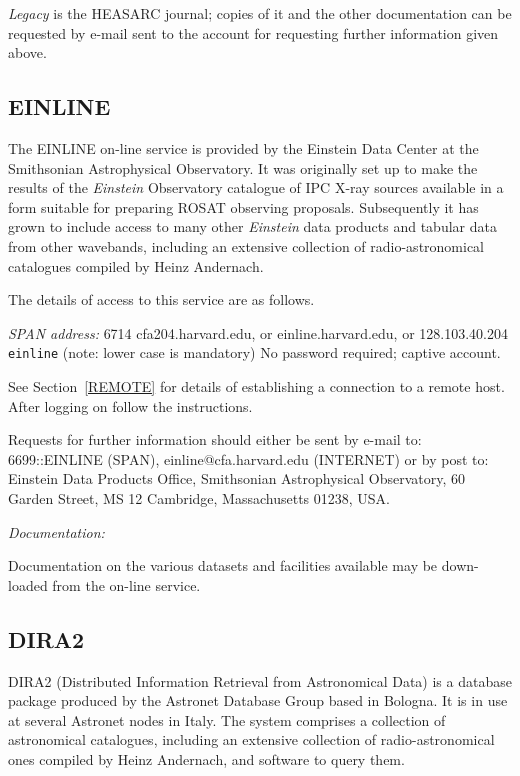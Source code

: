 \documentclass[twoside,11pt]{article}
\newcommand{\xlabel}[1]{}
\begin{document}
{\it Legacy} is the HEASARC journal; copies of it and the other 
documentation can be requested by e-mail sent to the account for 
requesting further information given above.

\subsection{EINLINE\xlabel{einline}}

The EINLINE on-line service is provided by the Einstein Data Center at
the Smithsonian Astrophysical Observatory. It was originally set up to
make the results of the {\it Einstein} Observatory catalogue of IPC 
X-ray sources available in a form suitable for preparing ROSAT observing
proposals. Subsequently it has grown to include access to many other 
{\it Einstein} data products and tabular data from other wavebands,
including an extensive collection of radio-astronomical catalogues
compiled by Heinz Andernach.

The details of access to this service are as follows.

{\it SPAN address: } 6714
 cfa204.harvard.edu, or 
einline.harvard.edu, or 128.103.40.204
 \verb-einline- (note: lower case is mandatory)
 No password required; captive account.

See Section~\ref{REMOTE} for details of establishing a connection to
a remote host. After logging on follow the instructions.

Requests for further information should either be sent by e-mail to:
6699::EINLINE (SPAN), einline@cfa.harvard.edu (INTERNET) or by post to: 
Einstein Data Products Office, Smithsonian Astrophysical Observatory, 
60 Garden Street, MS 12 Cambridge, Massachusetts 01238, USA.

{\it Documentation:}

Documentation on the various datasets and facilities available may be
down-loaded from the on-line service.

\subsection{DIRA2\xlabel{dira2}}

DIRA2 (Distributed Information Retrieval from Astronomical Data) is a
database package produced by the Astronet Database Group based in 
Bologna. It is in use at several Astronet nodes in Italy. The system
comprises a collection of astronomical catalogues, including an 
extensive collection of radio-astronomical ones compiled by Heinz 
Andernach, and software to query
them.
\end{document}
